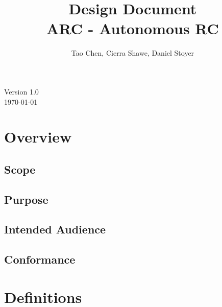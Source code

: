 \documentclass[compsoc,draftclsnofoot,onecolumn,10pt]{IEEEtran}
\date{}
\begin{document}
\begin{titlepage}
	\title{Design Document\\
	ARC - Autonomous RC}
	\author{Tao Chen, Cierra Shawe, Daniel Stoyer}
	\maketitle
	\begin{center}
	Version 1.0\\
	\vspace{1.9cm}
	\today
	\end{center}

	\thispagestyle{empty} %
	
\end{titlepage}

\tableofcontents

\newpage

\section{Overview}  
\subsection{Scope} 
\subsection{Purpose}
\subsection{Intended Audience} 
\subsection{Conformance}

\section{Definitions} 
\end{document}
